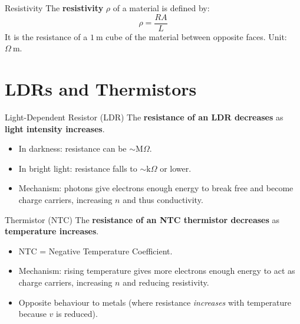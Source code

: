 \begin{definitionbox}{Resistivity}
The \textbf{resistivity} $\rho$ of a material is defined by:
$$\rho = \frac{RA}{L}$$
It is the resistance of a $1\ \text{m}$ cube of the material between opposite faces. Unit: $\Omega\ \text{m}$.
\end{definitionbox}

\section{LDRs and Thermistors}

\begin{definitionbox}{Light-Dependent Resistor (LDR)}
The \textbf{resistance of an LDR decreases} as \textbf{light intensity increases}.
\begin{itemize}[itemsep=2pt]
  \item In darkness: resistance can be $\sim\text{M}\Omega$.
  \item In bright light: resistance falls to $\sim\text{k}\Omega$ or lower.
  \item Mechanism: photons give electrons enough energy to break free and become charge carriers, increasing $n$ and thus conductivity.
\end{itemize}
\end{definitionbox}

\begin{definitionbox}{Thermistor (NTC)}
The \textbf{resistance of an NTC thermistor decreases} as \textbf{temperature increases}.
\begin{itemize}[itemsep=2pt]
  \item NTC = Negative Temperature Coefficient.
  \item Mechanism: rising temperature gives more electrons enough energy to act as charge carriers, increasing $n$ and reducing resistivity.
  \item Opposite behaviour to metals (where resistance \emph{increases} with temperature because $v$ is reduced).
\end{itemize}
\end{definitionbox}

